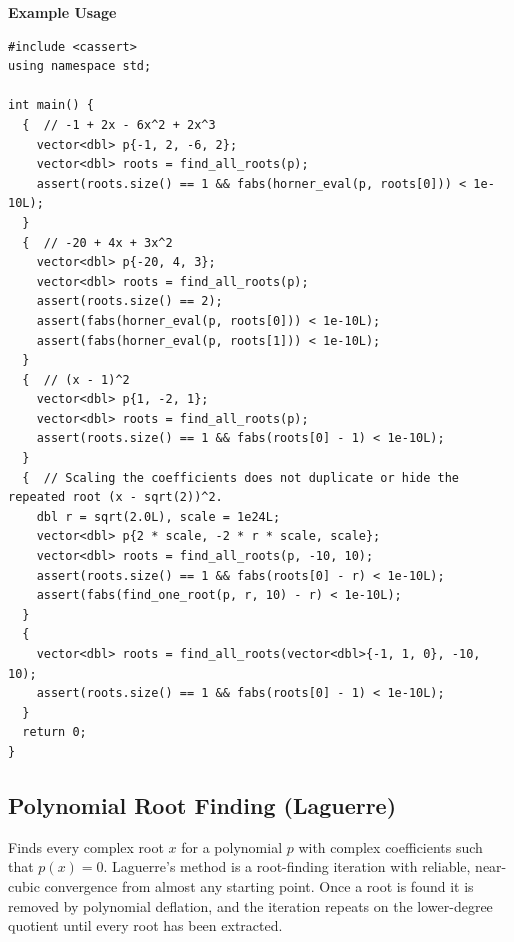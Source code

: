 \textbf{Example Usage}\par
\begin{lstlisting}[style=cpp]
#include <cassert>
using namespace std;

int main() {
  {  // -1 + 2x - 6x^2 + 2x^3
    vector<dbl> p{-1, 2, -6, 2};
    vector<dbl> roots = find_all_roots(p);
    assert(roots.size() == 1 && fabs(horner_eval(p, roots[0])) < 1e-10L);
  }
  {  // -20 + 4x + 3x^2
    vector<dbl> p{-20, 4, 3};
    vector<dbl> roots = find_all_roots(p);
    assert(roots.size() == 2);
    assert(fabs(horner_eval(p, roots[0])) < 1e-10L);
    assert(fabs(horner_eval(p, roots[1])) < 1e-10L);
  }
  {  // (x - 1)^2
    vector<dbl> p{1, -2, 1};
    vector<dbl> roots = find_all_roots(p);
    assert(roots.size() == 1 && fabs(roots[0] - 1) < 1e-10L);
  }
  {  // Scaling the coefficients does not duplicate or hide the repeated root (x - sqrt(2))^2.
    dbl r = sqrt(2.0L), scale = 1e24L;
    vector<dbl> p{2 * scale, -2 * r * scale, scale};
    vector<dbl> roots = find_all_roots(p, -10, 10);
    assert(roots.size() == 1 && fabs(roots[0] - r) < 1e-10L);
    assert(fabs(find_one_root(p, r, 10) - r) < 1e-10L);
  }
  {
    vector<dbl> roots = find_all_roots(vector<dbl>{-1, 1, 0}, -10, 10);
    assert(roots.size() == 1 && fabs(roots[0] - 1) < 1e-10L);
  }
  return 0;
}
\end{lstlisting}
\subsection{Polynomial Root Finding (Laguerre)}
\label{sec:5.4.4}
Finds every complex root $x$ for a polynomial $p$ with complex coefficients such that $p(x) = 0$. Laguerre's method is a root-finding iteration with reliable, near-cubic convergence from almost any starting point. Once a root is found it is removed by polynomial deflation, and the iteration repeats on the lower-degree quotient until every root has been extracted.

